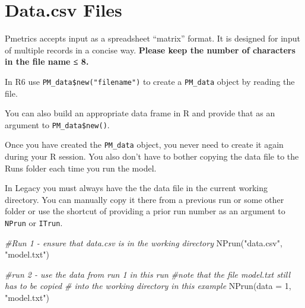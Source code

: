 \documentclass[
]{book}
\newenvironment{Shaded}{\begin{snugshade}}{\end{snugshade}}
\newcommand{\AttributeTok}[1]{\textcolor[rgb]{0.77,0.63,0.00}{#1}}
\newcommand{\CommentTok}[1]{\textcolor[rgb]{0.56,0.35,0.01}{\textit{#1}}}
\newcommand{\DecValTok}[1]{\textcolor[rgb]{0.00,0.00,0.81}{#1}}
\newcommand{\FunctionTok}[1]{\textcolor[rgb]{0.00,0.00,0.00}{#1}}
\newcommand{\NormalTok}[1]{#1}
\newcommand{\OtherTok}[1]{\textcolor[rgb]{0.56,0.35,0.01}{#1}}
\newcommand{\SpecialCharTok}[1]{\textcolor[rgb]{0.00,0.00,0.00}{#1}}
\newcommand{\StringTok}[1]{\textcolor[rgb]{0.31,0.60,0.02}{#1}}
\begin{document}
\hypertarget{data.csv-files}{%
\section{Data.csv Files}\label{data.csv-files}}

Pmetrics accepts input as a spreadsheet ``matrix'' format. It is designed
for input of multiple records in a concise way. \textbf{Please keep the number
of characters in the file name ≤ 8.}

In {R6} use \texttt{PM\_data\$new("filename")} to create a \texttt{PM\_data} object by reading the file.

\begin{Shaded}
\end{Shaded}

You can also build an appropriate data frame in R and provide that as an argument to \texttt{PM\_data\$new()}.

\begin{Shaded}
\end{Shaded}

Once you have created the \texttt{PM\_data} object, you never need to create it again during your R session. You also don't have to bother copying the data file to the Runs folder each time you run the model.

In {Legacy} you must always have the the data file in the current working directory. You can manually copy it there from a previous run or some other folder or use the shortcut of providing a prior run number as an argument to \texttt{NPrun} or \texttt{ITrun}.

\begin{Shaded}
\begin{Highlighting}[]
\CommentTok{\#Run 1 {-} ensure that data.csv is in the working directory}
\FunctionTok{NPrun}\NormalTok{(}\StringTok{"data.csv"}\NormalTok{, }\StringTok{"model.txt"}\NormalTok{)}

\CommentTok{\#run 2 {-} use the data from run 1 in this run}
\CommentTok{\#note that the file model.txt still has to be copied}
\CommentTok{\# into the working directory in this example}
\FunctionTok{NPrun}\NormalTok{(}\AttributeTok{data =} \DecValTok{1}\NormalTok{, }\StringTok{"model.txt"}\NormalTok{)}
\end{Highlighting}
\end{Shaded}
\end{document}
